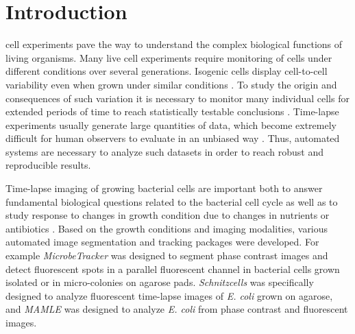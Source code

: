 \documentclass[journal]{IEEEtran}
\begin{document}
%
\IEEEpeerreviewmaketitle



\section{Introduction}
% 
% 
% 
% 
 cell experiments pave the way to understand the complex biological functions of living organisms. Many live cell experiments require monitoring of cells under different conditions over several generations. Isogenic cells display cell-to-cell variability even when grown under similar conditions \cite{elowitzstochastic2002}. To study the origin and consequences of such variation it is necessary to monitor many individual cells for extended periods of time to reach statistically testable conclusions \cite{yuichiquantify2010}. Time-lapse experiments usually generate large quantities of data, which become extremely difficult for human observers to evaluate in an unbiased way \cite{qiangmicroscope2008}. Thus, automated systems are necessary to analyze such datasets in order to reach robust and reproducible results. 

Time-lapse imaging of growing bacterial cells are important both to answer fundamental biological questions related to the bacterial cell cycle as well as to study response to changes in growth condition due to changes in nutrients or antibiotics \cite{walldenstudying2011}. Based on the growth conditions and imaging modalities, various automated image segmentation and tracking packages were developed. For example \textit{MicrobeTracker} \cite {sliusarenkohigh2011} was designed to segment phase contrast images and detect fluorescent spots in a parallel fluorescent channel in bacterial cells grown isolated or in micro-colonies on agarose pads. \textit{Schnitzcells} \cite{youngmeasuring2012} was specifically designed to analyze fluorescent time-lapse images of \textit{E. coli} grown on agarose, and \textit{MAMLE} \cite {chowdhurycell2013} was designed to analyze \textit{E. coli} from phase contrast and fluorescent images.
\end{document}
